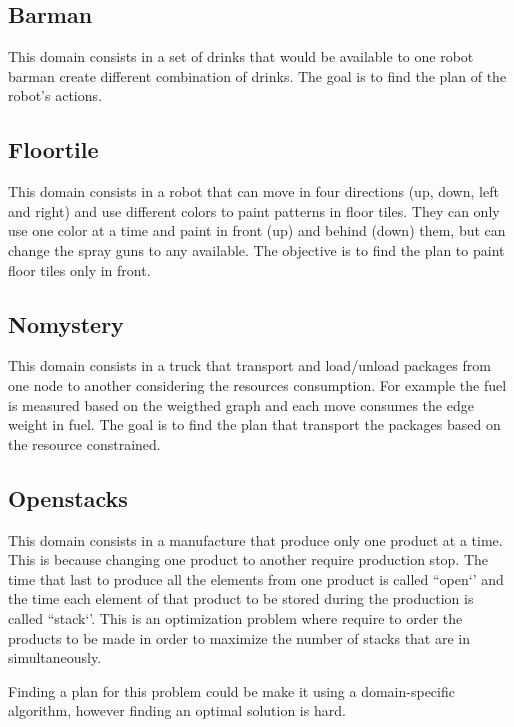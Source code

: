 \subsection{Barman}
This domain consists in a set of drinks that would be available to one robot barman create different combination of drinks. The goal is to find the plan of the robot's actions.

\subsection{Floortile}
This domain consists in a robot that can move in four directions (up, down, left and right) and use different colors to paint patterns in floor tiles. They can only use one color at a time and paint in front (up) and behind (down) them, but can change the spray guns to any available. The objective is to find the plan to paint floor tiles only in front.%

\subsection{Nomystery}
This domain consists in a truck that transport and load/unload packages from one node to another considering the resources consumption. For example the fuel is measured based on the weigthed graph and each move consumes the edge weight in fuel. The goal is to find the plan that transport the packages based on the resource constrained.

\subsection{Openstacks}
This domain consists in a manufacture that produce only one product at a time. This is because changing one product to another require production stop. The time that last to produce all the elements from one product is called ``open‘’ and the time each element of that product to be stored during the production is called ``stack‘’. This is an optimization problem where require to order the products to be made in order to maximize the number of stacks that are in simultaneously.

Finding a plan for this problem could be make it using a domain-specific algorithm, however finding an optimal solution is hard.


